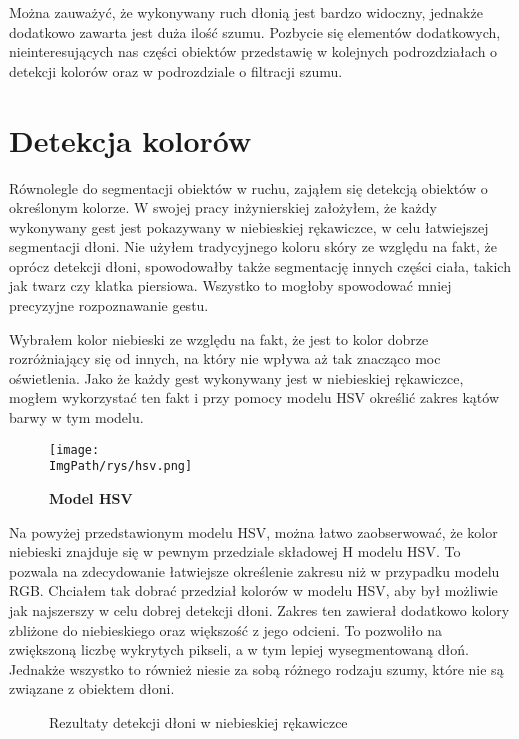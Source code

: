 \documentclass[a4paper,12pt,twoside,openany]{report}
\newcommand{\ImgPath}{.}
\begin{document}
Można zauważyć, że wykonywany ruch dłonią jest bardzo widoczny, jednakże dodatkowo zawarta jest duża ilość szumu. Pozbycie się elementów dodatkowych, nieinteresujących nas części obiektów przedstawię w kolejnych podrozdziałach o detekcji kolorów oraz w podrozdziale o filtracji szumu. 

\section{Detekcja kolorów}
Równolegle do segmentacji obiektów w ruchu, zająłem się detekcją obiektów o określonym kolorze. W swojej pracy inżynierskiej założyłem, że każdy wykonywany gest jest pokazywany w niebieskiej rękawiczce, w celu łatwiejszej segmentacji dłoni. Nie użyłem tradycyjnego koloru skóry ze względu na fakt, że oprócz detekcji dłoni, spowodowałby także segmentację innych części ciała, takich jak twarz czy klatka piersiowa. Wszystko to mogłoby spowodować mniej precyzyjne rozpoznawanie gestu.

Wybrałem kolor niebieski ze względu na fakt, że jest to kolor dobrze rozróżniający się od innych, na który nie wpływa aż tak znacząco moc oświetlenia.
Jako że każdy gest wykonywany jest w niebieskiej rękawiczce, mogłem wykorzystać ten fakt i przy pomocy modelu HSV określić zakres kątów barwy w tym modelu. 

\begin{figure}[H]	
	\centering
	\texttt{[image: \\ImgPath/rys/hsv.png]}
	
	\caption{  \textbf{Model HSV}}
\end{figure}

Na powyżej przedstawionym modelu HSV, można łatwo zaobserwować, że kolor niebieski znajduje się w pewnym przedziale składowej H modelu HSV. To pozwala na zdecydowanie łatwiejsze określenie zakresu niż w przypadku modelu RGB. 
Chciałem tak dobrać przedział kolorów w modelu HSV, aby był możliwie jak najszerszy w celu dobrej detekcji dłoni. Zakres ten zawierał dodatkowo kolory zbliżone do niebieskiego oraz większość z jego odcieni. To pozwoliło na zwiększoną liczbę wykrytych pikseli, a w tym lepiej wysegmentowaną dłoń. Jednakże wszystko to również niesie za sobą różnego rodzaju szumy, które nie są związane z obiektem dłoni. 
\begin{figure}[H]
	\centering
	\caption{Rezultaty detekcji dłoni w niebieskiej rękawiczce}
\end{figure}
\end{document}
